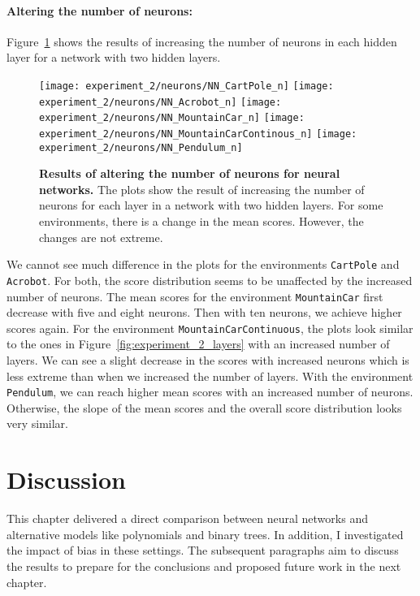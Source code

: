 \paragraph{Altering the number of neurons:} Figure~\ref{fig:experiment_2_neurons} shows the results of increasing the number of neurons in each hidden layer for a network with two hidden layers.
\begin{figure}[!ht]
  \centering
  \texttt{[image: experiment\_2/neurons/NN\_CartPole\_n]}
  \texttt{[image: experiment\_2/neurons/NN\_Acrobot\_n]}
  \texttt{[image: experiment\_2/neurons/NN\_MountainCar\_n]}
  \texttt{[image: experiment\_2/neurons/NN\_MountainCarContinous\_n]}
  \texttt{[image: experiment\_2/neurons/NN\_Pendulum\_n]}
\caption[Results of altering the number of neurons for neural networks]{
  \textbf{Results of altering the number of neurons for neural networks.}
  The plots show the result of increasing the number of neurons for each layer in a network with two hidden layers. For some environments, there is a change in the mean scores. However, the changes are not extreme.
}
\label{fig:experiment_2_neurons}
\end{figure}
We cannot see much difference in the plots for the environments \verb|CartPole| and \verb|Acrobot|. For both, the score distribution seems to be unaffected by the increased number of neurons. The mean scores for the environment \verb|MountainCar| first decrease with five and eight neurons. Then with ten neurons, we achieve higher scores again. For the environment \verb|MountainCarContinuous|, the plots look similar to the ones in Figure~\ref{fig:experiment_2_layers} with an increased number of layers. We can see a slight decrease in the scores with increased neurons which is less extreme than when we increased the number of layers. With the environment \verb|Pendulum|, we can reach higher mean scores with an increased number of neurons. Otherwise, the slope of the mean scores and the overall score distribution looks very similar.

\clearpage
\section{Discussion}
This chapter delivered a direct comparison between neural networks and alternative models like polynomials and binary trees. In addition, I investigated the impact of bias in these settings. The subsequent paragraphs aim to discuss the results to prepare for the conclusions and proposed future work in the next chapter.

